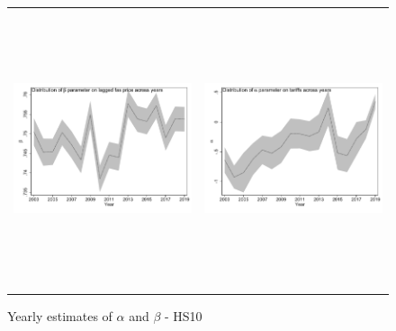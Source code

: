 \documentclass[a4paper,11pt]{article}
\begin{document}
\begin{figure}[htbp]
\caption{Yearly estimates of $\alpha$ and $\beta$ - HS10}\label{fig: FS_IV_HS10}
\begin{center}
\begin{tabular}{cc}
\includegraphics[width=3.2in, height=3.2in,keepaspectratio]{beta_lag_HS10.pdf}
& \includegraphics[width=3.2in,height=3.2in,keepaspectratio]{alpha_tariff_HS10.pdf} \\
\end{tabular}
\end{center}
\end{figure}
\end{document}
